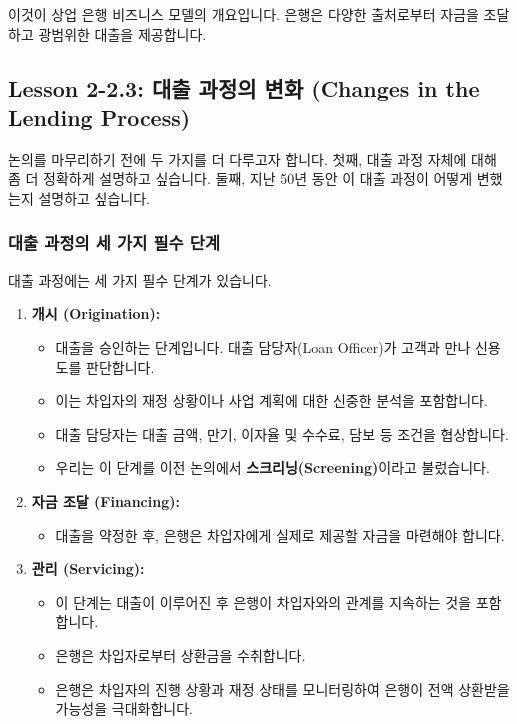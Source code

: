 \documentclass[11pt,a4paper]{book}
\theoremstyle{definition}
\begin{document}
\begin{summarybox}[title={Lesson 2-2.2 요약}]
이것이 상업 은행 비즈니스 모델의 개요입니다. 은행은 다양한 출처로부터 자금을 조달하고 광범위한 대출을 제공합니다.
\end{summarybox}


\subsection{Lesson 2-2.3: 대출 과정의 변화 (Changes in the Lending Process)}

논의를 마무리하기 전에 두 가지를 더 다루고자 합니다. 첫째, 대출 과정 자체에 대해 좀 더 정확하게 설명하고 싶습니다. 둘째, 지난 50년 동안 이 대출 과정이 어떻게 변했는지 설명하고 싶습니다.

\subsubsection*{대출 과정의 세 가지 필수 단계}
대출 과정에는 세 가지 필수 단계가 있습니다.
\begin{enumerate}
    \item \textbf{개시 (Origination):}
    \begin{itemize}
        \item 대출을 승인하는 단계입니다. 대출 담당자(Loan Officer)가 고객과 만나 신용도를 판단합니다.
        \item 이는 차입자의 재정 상황이나 사업 계획에 대한 신중한 분석을 포함합니다.
        \item 대출 담당자는 대출 금액, 만기, 이자율 및 수수료, 담보 등 조건을 협상합니다.
        \item 우리는 이 단계를 이전 논의에서 \textbf{스크리닝(Screening)}이라고 불렀습니다.
    \end{itemize}

    \item \textbf{자금 조달 (Financing):}
    \begin{itemize}
        \item 대출을 약정한 후, 은행은 차입자에게 실제로 제공할 자금을 마련해야 합니다.
    \end{itemize}

    \item \textbf{관리 (Servicing):}
    \begin{itemize}
        \item 이 단계는 대출이 이루어진 후 은행이 차입자와의 관계를 지속하는 것을 포함합니다.
        \item 은행은 차입자로부터 상환금을 수취합니다.
        \item 은행은 차입자의 진행 상황과 재정 상태를 모니터링하여 은행이 전액 상환받을 가능성을 극대화합니다.
    \end{itemize}
\end{enumerate}
\end{document}
